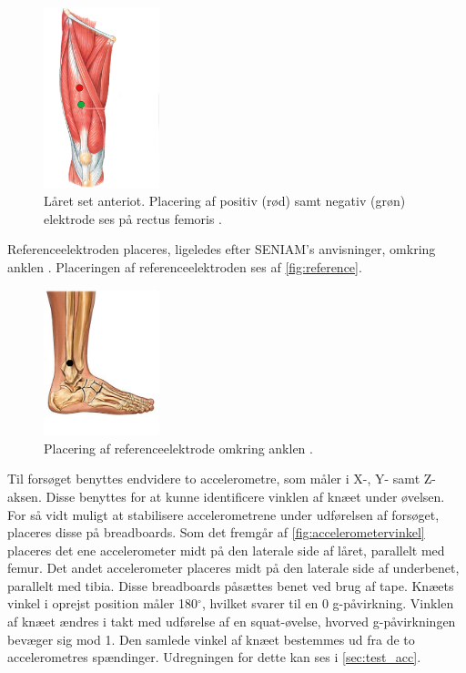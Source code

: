 \begin{figure}[H]
\centering
\includegraphics[width=0.3\textwidth]{figures/laarmuskel.png}
\caption{Låret set anteriot. Placering af positiv (rød) samt negativ (grøn) elektrode ses på rectus femoris \citep{martini2012}.}
\label{fig:laarmuskler}
\end{figure}

Referenceelektroden placeres, ligeledes efter SENIAM's anvisninger, omkring anklen \citep{seniam2016}. Placeringen af referenceelektroden ses af \autoref{fig:reference}.

\begin{figure}[H]
\centering
\includegraphics[width=0.3\textwidth]{figures/reference}
\caption{Placering af referenceelektrode omkring anklen \citep{ankle2016}.}
\label{fig:reference}
\end{figure}

Til forsøget benyttes endvidere to accelerometre, som måler i X-, Y- samt Z-aksen. Disse benyttes for at kunne identificere vinklen af knæet under øvelsen. For så vidt muligt at stabilisere accelerometrene under udførelsen af forsøget, placeres disse på breadboards. 
Som det fremgår af \autoref{fig:accelerometervinkel} placeres det ene accelerometer midt på den laterale side af låret, parallelt med femur. Det andet accelerometer placeres midt på den laterale side af underbenet, parallelt med tibia. Disse breadboards påsættes benet ved brug af tape. Knæets vinkel i oprejst position måler 180$^{\circ}$, hvilket svarer til en 0 g-påvirkning. Vinklen af knæet ændres i takt med udførelse af en squat-øvelse, hvorved g-påvirkningen bevæger sig mod 1. Den samlede vinkel af knæet bestemmes ud fra de to accelerometres spændinger. Udregningen for dette kan ses i \autoref{sec:test_acc}.

